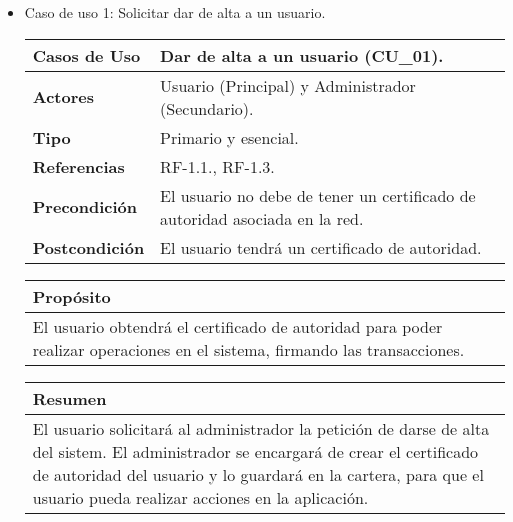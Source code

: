 \begin{itemize}
    \item Caso de uso 1: Solicitar dar de alta a un usuario.
    
    \begin{table}[h!]
        \centering
        \begin{tabular}{|l|p{}|}
            \hline
            \textbf{Casos de Uso}   &   Dar de alta a un usuario (CU\_01). \\
            \hline 
            \textbf{Actores}        &   Usuario (Principal) y Administrador (Secundario). \\ 
            \hline 
            \textbf{Tipo}           &   Primario y esencial. \\
            \hline
            \textbf{Referencias}    &   RF-1.1., RF-1.3. \\ 
            \hline
            \textbf{Precondición}   &   El usuario no debe de tener un certificado de autoridad asociada en la red. \\ 
            \hline
            \textbf{Postcondición}  &   El usuario tendrá un certificado de autoridad. \\ 
            \hline
        \end{tabular}
        
        \vspace{5mm}
        
        \begin{tabular}{|p{\textwidth}|}
            \hline
            \rowcolor{SeaGreen} \textbf{Propósito} \\
            \hline
            \multicolumn{1}{|p{12cm}|}{El usuario obtendrá el certificado de autoridad para poder realizar operaciones en el sistema, firmando las 
            transacciones.} \\ [0.5ex]
            \hline
        \end{tabular}
        
        \vspace{5mm}
        
        \begin{tabular}{|p{\textwidth}|}
            \hline
            \rowcolor{SeaGreen} \textbf{Resumen} \\
            \hline
            \multicolumn{1}{|p{12cm}|}{El usuario solicitará al administrador la petición de darse de alta del sistem. El administrador se encargará de 
            crear el certificado de autoridad del usuario y lo guardará en la cartera, para que el usuario pueda realizar acciones en la 
            aplicación.} \\ [0.5ex]
            \hline
        \end{tabular}
        

\end{table}
\end{itemize}
